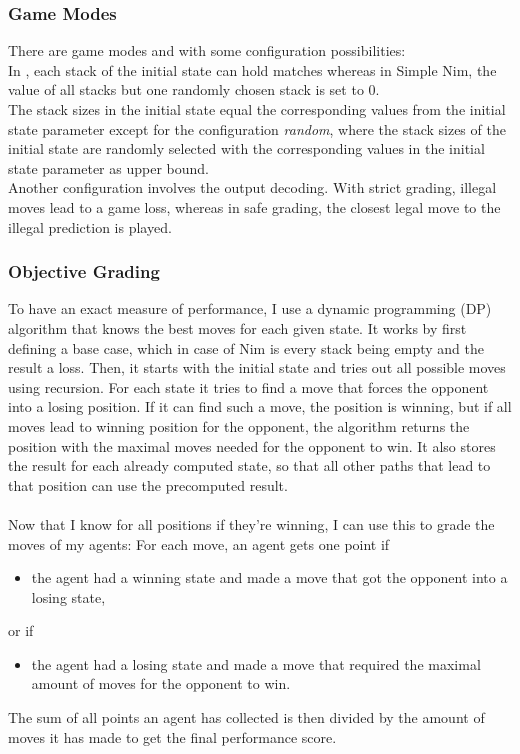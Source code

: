 \documentclass[11pt]{report}
\begin{document}
\begin{enumerate}
    \subsubsection{Game Modes}
    There are game modes  and  with some configuration possibilities:
    \\
    In , each stack of the initial state can hold matches whereas in Simple Nim, the value of all stacks but one randomly chosen stack is set to 0.
    \\
    The stack sizes in the initial state equal the corresponding values from the initial state parameter except for the configuration \textit{random}, where the stack sizes of the initial state are randomly selected with the corresponding values in the initial state parameter as upper bound.
    \\
    Another configuration involves the output decoding.
    With strict grading, illegal moves lead to a game loss, whereas in safe grading, the closest legal move to the illegal prediction is played.

    \subsubsection{Objective Grading}
    To have an exact measure of performance, I use a dynamic programming (DP) algorithm that knows the best moves for each given state.
    It works by first defining a base case, which in case of Nim is every stack being empty and the result a loss.
    Then, it starts with the initial state and tries out all possible moves using recursion.
    For each state it tries to find a move that forces the opponent into a losing position.
    If it can find such a move, the position is winning, but if all moves lead to winning position for the opponent, the algorithm returns the position with the maximal moves needed for the opponent to win.
    It also stores the result for each already computed state, so that all other paths that lead to that position can use the precomputed result.
    \\ \\
    Now that I know for all positions if they're winning, I can use this to grade the moves of my agents:
    For each move, an agent gets one point if
    \begin{itemize}
        \item the agent had a winning state and made a move that got the opponent into a losing state,
    \end{itemize}
    or if
    \begin{itemize}
        \item the agent had a losing state and made a move that required the maximal amount of moves for the opponent to win.
    \end{itemize}
    The sum of all points an agent has collected is then divided by the amount of moves it has made to get the final performance score.



\end{enumerate}
\end{document}
